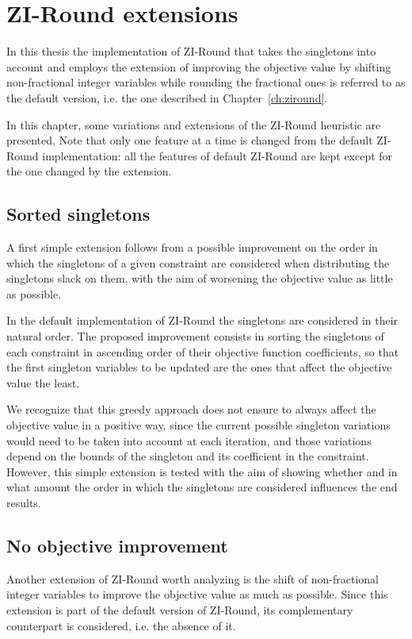 \documentclass[a4paper,12pt]{book}
\begin{document}
\chapter{ZI-Round extensions}
In this thesis the implementation of ZI-Round that takes the singletons into account and employs the extension of improving the objective value by shifting non-fractional integer variables while rounding the fractional ones is referred to as the default version, i.e. the one described in Chapter~\ref{ch:ziround}. \par
In this chapter, some variations and extensions of the ZI-Round heuristic are presented. Note that only one feature at a time is changed from the default ZI-Round implementation: all the features of default ZI-Round are kept except for the one changed by the extension.

\section{Sorted singletons}
A first simple extension follows from a possible improvement on the order in which the singletons of a given constraint are considered when distributing the singletons slack on them, with the aim of worsening the objective value as little as possible. \par 

In the default implementation of ZI-Round the singletons are considered in their natural order. The proposed improvement consists in sorting the singletons of each constraint in ascending order of their objective function coefficients, so that the first singleton variables to be updated are the ones that affect the objective value the least. \par

We recognize that this greedy approach does not ensure to always affect the objective value in a positive way, since the current possible singleton variations would need to be taken into account at each iteration, and those variations depend on the bounds of the singleton and its coefficient in the constraint. However, this simple extension is tested with the aim of showing whether and in what amount the order in which the singletons are considered influences the end results.

\section{No objective improvement}
Another extension of ZI-Round worth analyzing is the shift of non-fractional integer variables to improve the objective value as much as possible. Since this extension is part of the default version of ZI-Round, its complementary counterpart is considered, i.e. the absence of it. \par
\end{document}

